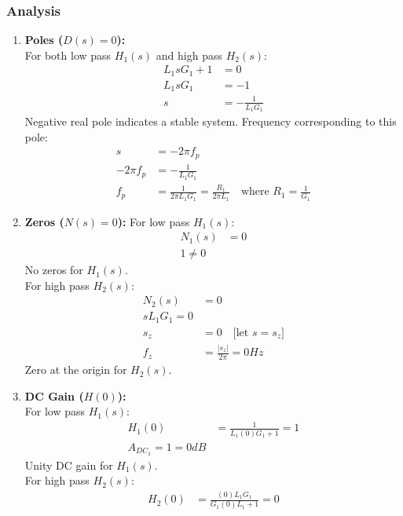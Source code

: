 \subsubsection{Analysis}
\begin{enumerate}
    \item \textbf{Poles (\(D(s) = 0\)):} \\
      For both low pass \(H_1(s)\) and high pass \(H_2(s)\):
      \begin{align*}
        L_1 s G_1 + 1 &= 0 \\
        L_1 s G_1 &= -1 \\
        s &= -\frac{1}{L_1 G_1}
      \end{align*}
      Negative real pole indicates a stable system. Frequency
      corresponding to this pole:
      \begin{align*}
        s &= -2 \pi f_p \\
        -2 \pi f_p &= -\frac{1}{L_1 G_1} \\
        f_p &= \frac{1}{2 \pi L_1 G_1} = \frac{R_1}{2 \pi L_1} \quad\text{where } R_1 = \frac{1}{G_1}
      \end{align*}
    \item \textbf{Zeros (\(N(s) = 0\)):}
      For low pass \(H_1(s)\):
      \begin{align*}
        N_1(s) &= 0 \\
        1 \neq 0
      \end{align*}
      No zeros for \(H_1(s)\). \\
      For high pass \(H_2(s)\):
      \begin{align*}
        N_2(s) &= 0 \\
        s L_1 G_1 = 0 \\
        s_z &= 0 \quad \text{[let \(s = s_z\)]} \\
        f_z &= \frac{|s_z|}{2\pi} = 0 Hz
      \end{align*}
      Zero at the origin for \(H_2(s)\).
    \item \textbf{DC Gain (\(H(0)\)):} \\
      For low pass \(H_1(s)\):
      \begin{align*}
        H_1(0) &= \frac{1}{L_1 (0) G_1 + 1} = 1 \\
        A_{DC_1} = 1 = 0 dB
      \end{align*}
      Unity DC gain for \(H_1(s)\). \\
      For high pass \(H_2(s)\):
      \begin{align*}
        H_2(0) &= \frac{(0) L_1 G_1}{G_1 (0) L_1 + 1} = 0 \\

\end{align*}
\end{enumerate}
